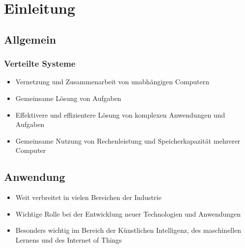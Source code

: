 \section{Einleitung}
\subsection{Allgemein}
\frametitle{Verteilte Systeme}
\begin{frame}
\begin{itemize}
\item Vernetzung und Zusammenarbeit von unabhängigen Computern
\item Gemeinsame Lösung von Aufgaben
\item Effektivere und effizientere Lösung von komplexen Anwendungen und Aufgaben
\item Gemeinsame Nutzung von Rechenleistung und Speicherkapazität mehrerer Computer
\end{itemize}
\end{frame}
\subsection{Anwendung}
\begin{frame}
\begin{itemize}
\item Weit verbreitet in vielen Bereichen der Industrie
\item Wichtige Rolle bei der Entwicklung neuer Technologien und Anwendungen
\item Besonders wichtig im Bereich der Künstlichen Intelligenz, des maschinellen Lernens und des Internet of Things
\end{itemize}

\end{frame}
